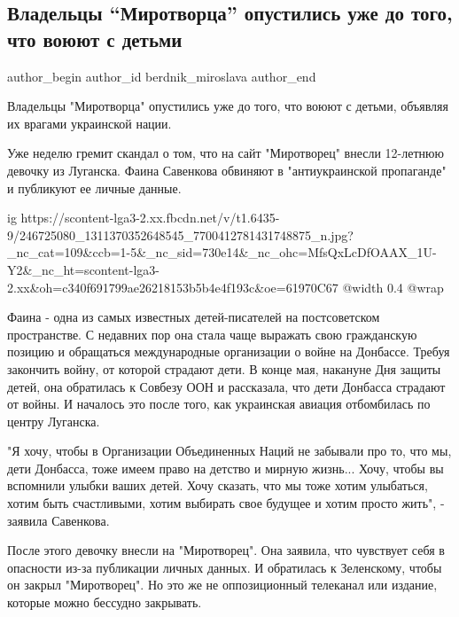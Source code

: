  
 
 
 
 
 
\subsection{Владельцы \enquote{Миротворца} опустились уже до того, что воюют с детьми}
\label{sec:20_10_2021.fb.berdnik_miroslava.1.mirotvorec_deti_savenkova}
 
\ifcmt
 author_begin
   author_id berdnik_miroslava
 author_end
\fi

Владельцы "Миротворца" опустились уже до того, что воюют с детьми, объявляя их
врагами украинской нации.

Уже неделю гремит скандал о том, что на сайт "Миротворец" внесли 12-летнюю
девочку из Луганска. Фаина Савенкова обвиняют в "антиукраинской пропаганде" и
публикуют ее личные данные.

\ifcmt
  ig https://scontent-lga3-2.xx.fbcdn.net/v/t1.6435-9/246725080_1311370352648545_7700412781431748875_n.jpg?_nc_cat=109&ccb=1-5&_nc_sid=730e14&_nc_ohc=MfsQxLcDfOAAX_1U-Y2&_nc_ht=scontent-lga3-2.xx&oh=c340f691799ae26218153b5b4e4f193c&oe=61970C67
  @width 0.4
  @wrap 
\fi

Фаина - одна из самых известных детей-писателей на постсоветском пространстве.
С недавних пор она стала чаще выражать свою гражданскую позицию и обращаться
международные организации о войне на Донбассе. Требуя закончить войну, от
которой страдают дети. В конце мая, накануне Дня защиты детей, она обратилась к
Совбезу ООН и рассказала, что дети Донбасса страдают от войны. И началось это
после того, как украинская авиация отбомбилась по центру Луганска. 

"Я хочу, чтобы в Организации Объединенных Наций не забывали про то, что мы,
дети Донбасса, тоже имеем право на детство и мирную жизнь... Хочу, чтобы вы
вспомнили улыбки ваших детей. Хочу сказать, что мы тоже хотим улыбаться, хотим
быть счастливыми, хотим выбирать свое будущее и хотим просто жить", - заявила
Савенкова. 

После этого девочку внесли на "Миротворец".  Она заявила, что чувствует себя в
опасности из-за публикации личных данных. И обратилась к Зеленскому, чтобы он
закрыл "Миротворец".  Но это же не оппозиционный телеканал или издание, которые
можно бессудно закрывать.
